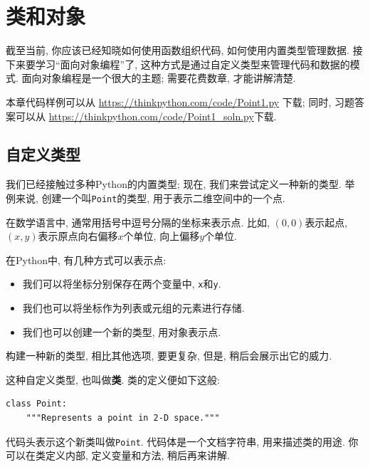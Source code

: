\documentclass[10pt]{book}
\begin{document}
\chapter{类和对象}
\label{clobjects}

截至当前, 你应该已经知晓如何使用函数组织代码, 
如何使用内置类型管理数据. 
接下来要学习``面向对象编程''了, 
这种方式是通过自定义类型来管理代码和数据的模式. 
面向对象编程是一个很大的主题; 需要花费数章, 才能讲解清楚. 

本章代码样例可以从
\url{https://thinkpython.com/code/Point1.py} 下载;
同时, 习题答案可以从
\url{https://thinkpython.com/code/Point1_soln.py}下载.


\section{自定义类型}
\label{point}

我们已经接触过多种Python的内置类型;
现在, 我们来尝试定义一种新的类型. 
举例来说, 创建一个叫{\tt Point}的类型, 用于表示二维空间中的一个点. 

在数学语言中, 通常用括号中逗号分隔的坐标来表示点. 
比如, $(0,0)$表示起点, $(x,y)$表示原点向右偏移$x$个单位, 
向上偏移$y$个单位. 

在Python中, 有几种方式可以表示点:

\begin{itemize}

\item 我们可以将坐标分别保存在两个变量中, {\tt x}和{\tt y}. 

\item 我们也可以将坐标作为列表或元组的元素进行存储. 

\item 我们也可以创建一个新的类型, 用对象表示点. 

\end{itemize}

构建一种新的类型, 相比其他选项, 要更复杂, 
但是, 稍后会展示出它的威力. 

这种自定义类型, 也叫做{\bf 类}. 
类的定义便如下这般:

\begin{verbatim}
class Point:
    """Represents a point in 2-D space."""
\end{verbatim}
%
代码头表示这个新类叫做{\tt Point}. 
代码体是一个文档字符串, 用来描述类的用途. 
你可以在类定义内部, 定义变量和方法, 
稍后再来讲解. 
\end{document}
